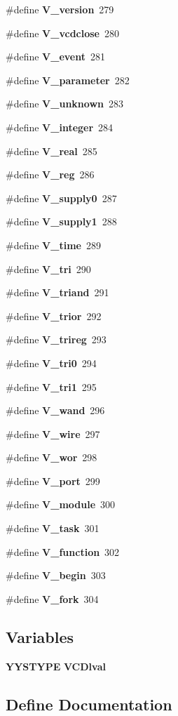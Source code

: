 \begin{CompactItemize}
\item 
\#define {\bf V\_\-version}\ 279
\item 
\#define {\bf V\_\-vcdclose}\ 280
\item 
\#define {\bf V\_\-event}\ 281
\item 
\#define {\bf V\_\-parameter}\ 282
\item 
\#define {\bf V\_\-unknown}\ 283
\item 
\#define {\bf V\_\-integer}\ 284
\item 
\#define {\bf V\_\-real}\ 285
\item 
\#define {\bf V\_\-reg}\ 286
\item 
\#define {\bf V\_\-supply0}\ 287
\item 
\#define {\bf V\_\-supply1}\ 288
\item 
\#define {\bf V\_\-time}\ 289
\item 
\#define {\bf V\_\-tri}\ 290
\item 
\#define {\bf V\_\-triand}\ 291
\item 
\#define {\bf V\_\-trior}\ 292
\item 
\#define {\bf V\_\-trireg}\ 293
\item 
\#define {\bf V\_\-tri0}\ 294
\item 
\#define {\bf V\_\-tri1}\ 295
\item 
\#define {\bf V\_\-wand}\ 296
\item 
\#define {\bf V\_\-wire}\ 297
\item 
\#define {\bf V\_\-wor}\ 298
\item 
\#define {\bf V\_\-port}\ 299
\item 
\#define {\bf V\_\-module}\ 300
\item 
\#define {\bf V\_\-task}\ 301
\item 
\#define {\bf V\_\-function}\ 302
\item 
\#define {\bf V\_\-begin}\ 303
\item 
\#define {\bf V\_\-fork}\ 304
\end{CompactItemize}
\subsection*{Variables}
\begin{CompactItemize}
\item 
{\bf YYSTYPE} {\bf VCDlval}
\end{CompactItemize}


\subsection{Define Documentation}

